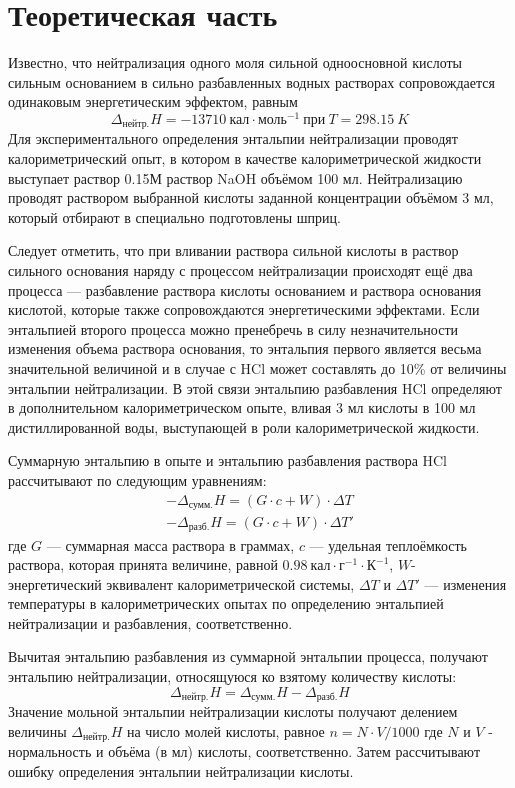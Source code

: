 \documentclass[a4paper]{article}
\begin{document}
\section*{\centering Теоретическая часть}

Известно, что нейтрализация одного моля сильной одноосновной кислоты
сильным основанием в сильно разбавленных водных растворах
сопровождается одинаковым энергетическим эффектом,
равным
\begin{equation*}
    \Delta_\text{нейтр.}H = -13710\ \text{кал}\cdot\text{моль}^{-1}\ \text{при}\ T = 298.15\ K
\end{equation*}
Для экспериментального определения энтальпии нейтрализации проводят калориметрический опыт,
в котором в качестве калориметрической жидкости выступает раствор 0.15М раствор NaOH объёмом 100 мл.
Нейтрализацию проводят раствором выбранной кислоты заданной концентрации объёмом 3 мл,
который отбирают в специально подготовлены шприц.

Следует отметить, что при вливании раствора сильной кислоты в раствор сильного основания наряду
с процессом нейтрализации происходят ещё два процесса --- разбавление раствора кислоты основанием и раствора основания кислотой,
которые также сопровождаются энергетическими эффектами.
Если энтальпией второго процесса можно пренебречь в силу незначительности изменения объема раствора основания,
то энтальпия первого является весьма значительной величиной и в случае с HCl может составлять до 10\% от величины энтальпии нейтрализации.
В этой связи энтальпию разбавления HCl определяют в дополнительном калориметрическом опыте,
вливая 3 мл кислоты в 100 мл дистиллированной воды, выступающей в роли калориметрической жидкости.

Суммарную энтальпию в опыте и энтальпию разбавления раствора HCl рассчитывают по следующим уравнениям:
\begin{gather}
    -\Delta_\text{сумм.}H = (G \cdot c + W) \cdot \Delta T \\
    -\Delta_\text{разб.}H = (G \cdot c + W) \cdot \Delta T'
\end{gather}
где $G$ --- суммарная масса раствора в граммах,
$c$ --- удельная теплоёмкость раствора, которая принята величине, равной $0.98\ \text{кал}\cdot{г}^{-1}\cdot\text{К}^{-1}$,
$W$- энергетический эквивалент калориметрической системы,
$\Delta T$ и $\Delta T'$ --- изменения температуры в калориметрических опытах по определению энтальпией нейтрализации и разбавления, соответственно.

Вычитая энтальпию разбавления из суммарной энтальпии процесса, получают энтальпию нейтрализации, относящуюся ко взятому количеству кислоты:
\begin{equation}
    \Delta_\text{нейтр.}H = \Delta_\text{сумм.}H - \Delta_\text{разб.}H
\end{equation}
Значение мольной энтальпии нейтрализации кислоты получают делением величины $\Delta_\text{нейтр.}H$ на число молей кислоты,
равное $n = N \cdot V / 1000$ где $N$ и $V$ - нормальность и объёма (в мл) кислоты, соответственно.
Затем рассчитывают ошибку определения энтальпии нейтрализации кислоты.
\end{document}
